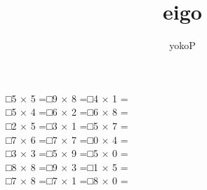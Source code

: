\documentclass[uplatex,
paper=a4,
fontsize=18pt,
jafontsize=16pt,
number_of_lines=30,
line_length=30zh,
baselineskip=25pt,
]{jlreq}
\author{yokoP}
\title{eigo}
\begin{document}
□\hspace{1em}5 × 5 =\hspace{3em}□\hspace{1em}9 × 8 =\hspace{3em}□\hspace{1em}4 × 1 =\hspace{3em}
\\

□\hspace{1em}5 × 4 =\hspace{3em}□\hspace{1em}6 × 2 =\hspace{3em}□\hspace{1em}6 × 8 =\hspace{3em}
\\

□\hspace{1em}2 × 5 =\hspace{3em}□\hspace{1em}3 × 1 =\hspace{3em}□\hspace{1em}5 × 7 =\hspace{3em}
\\

□\hspace{1em}7 × 6 =\hspace{3em}□\hspace{1em}7 × 7 =\hspace{3em}□\hspace{1em}0 × 4 =\hspace{3em}
\\

□\hspace{1em}3 × 3 =\hspace{3em}□\hspace{1em}5 × 9 =\hspace{3em}□\hspace{1em}5 × 0 =\hspace{3em}
\\

□\hspace{1em}8 × 8 =\hspace{3em}□\hspace{1em}9 × 3 =\hspace{3em}□\hspace{1em}1 × 5 =\hspace{3em}
\\

□\hspace{1em}7 × 8 =\hspace{3em}□\hspace{1em}7 × 1 =\hspace{3em}□\hspace{1em}8 × 0 =\hspace{3em}
\\
\end{document}
